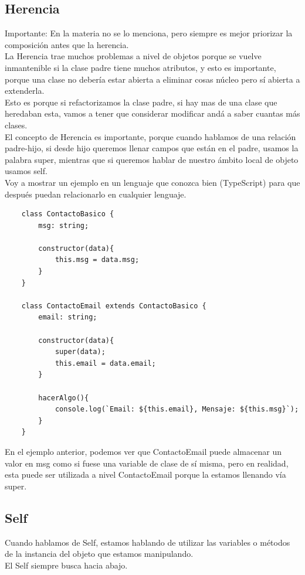 \documentclass[10pt,a4paper]{article}
\begin{document}
\subsection*{Herencia}
Importante: En la materia no se lo menciona, pero siempre es mejor priorizar la composición antes que la herencia. \\
La Herencia trae muchos problemas a nivel de objetos porque se vuelve inmantenible si la clase padre tiene muchos atributos, y esto es importante, porque una clase no debería estar abierta a eliminar cosas núcleo pero sí abierta a extenderla. \\
Esto es porque si refactorizamos la clase padre, si hay mas de una clase que heredaban esta, vamos a tener que considerar modificar andá a saber cuantas más clases. \\
El concepto de Herencia es importante, porque cuando hablamos de una relación padre-hijo, si desde hijo queremos llenar campos que están en el padre, usamos la palabra super, mientras que si queremos hablar de nuestro ámbito local de objeto usamos self. \\
Voy a mostrar un ejemplo en un lenguaje que conozca bien (TypeScript) para que después puedan relacionarlo en cualquier lenguaje. 
\begin{lstlisting}
    class ContactoBasico {
        msg: string;

        constructor(data){
            this.msg = data.msg;
        }
    }

    class ContactoEmail extends ContactoBasico {
        email: string;

        constructor(data){
            super(data);
            this.email = data.email;
        }

        hacerAlgo(){
            console.log(`Email: ${this.email}, Mensaje: ${this.msg}`);
        }
    }
\end{lstlisting}
En el ejemplo anterior, podemos ver que ContactoEmail puede almacenar un valor en msg como si fuese una variable de clase de sí misma, pero en realidad, esta puede ser utilizada a nivel ContactoEmail porque la estamos llenando vía super.
\subsection*{Self}
Cuando hablamos de Self, estamos hablando de utilizar las variables o métodos de la instancia del objeto que estamos manipulando. \\
El Self siempre busca hacia abajo. 
\end{document}
